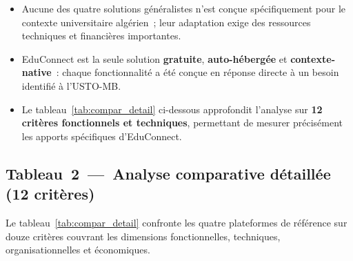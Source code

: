 

\medskip
\begin{tcolorbox}[
  colback  = ustolightblue!20,
  colframe = ustoblue,
  coltitle = white,
  fonttitle= \bfseries,
  title    = {Observations cl\'es issues du tableau~\ref{tab:compar_synth}~---~vers une analyse crit\`ere par crit\`ere},
  left=8pt, right=8pt, top=6pt, bottom=6pt,
  sharp corners=south
]
\begin{itemize}
  \item Aucune des quatre solutions g\'en\'eralistes n'est con\c{c}ue sp\'ecifiquement pour le contexte universitaire alg\'erien~; leur adaptation exige des ressources techniques et financi\`eres importantes.
  \item EduConnect est la seule solution \textbf{gratuite}, \textbf{auto-h\'eberg\'ee} et \textbf{contexte-native}~: chaque fonctionnalit\'e a \'et\'e con\c{c}ue en r\'eponse directe \`a un besoin identifi\'e \`a l'USTO-MB.
  \item Le tableau~\ref{tab:compar_detail} ci-dessous approfondit l'analyse sur \textbf{12 crit\`eres fonctionnels et techniques}, permettant de mesurer pr\'ecis\'ement les apports sp\'ecifiques d'EduConnect.
\end{itemize}
\end{tcolorbox}
\medskip

\subsection{Tableau~2~---~Analyse comparative d\'etaill\'ee (12 crit\`eres)}

Le tableau~\ref{tab:compar_detail} confronte les quatre plateformes de r\'ef\'erence sur douze crit\`eres couvrant les dimensions fonctionnelles, techniques, organisationnelles et \'economiques.

